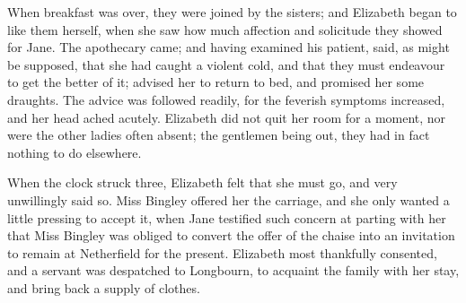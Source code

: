 When breakfast was over, they were joined by the sisters; and Elizabeth began to like them herself, when she saw how much affection and solicitude they showed for Jane. The apothecary came; and having examined his patient, said, as might be supposed, that she had caught a violent cold, and that they must endeavour to get the better of it; advised her to return to bed, and promised her some draughts. The advice was followed readily, for the feverish symptoms increased, and her head ached acutely. Elizabeth did not quit her room for a moment, nor were the other ladies often absent; the gentlemen being out, they had in fact nothing to do elsewhere.

When the clock struck three, Elizabeth felt that she must go, and very unwillingly said so. Miss Bingley offered her the carriage, and she only wanted a little pressing to accept it, when Jane testified such concern at parting with her that Miss Bingley was obliged to convert the offer of the chaise into an invitation to remain at Netherfield for the present. Elizabeth most thankfully consented, and a servant was despatched to Longbourn, to acquaint the family with her stay, and bring back a supply of clothes.